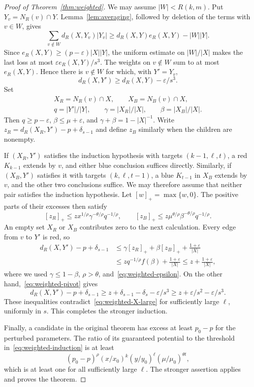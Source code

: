 \documentclass[11pt]{article}
\theoremstyle{definition}
\theoremstyle{remark}
\numberwithin{equation}{section}
\begin{document}
\begin{proof}[Proof of Theorem~\ref{thm:weighted}]
We may assume $|W|<R(k,m)$. Put $Y_v=N_R(v)\cap Y$. Lemma~\ref{lem:averaging}, followed by deletion of the terms with $v\in W$, gives
\[
 \sum_{v\notin W}d_R(X,Y_v)|Y_v|
 \ge d_R(X,Y)e_R(X,Y)-|W||Y|.
\]
Since $e_R(X,Y)\ge(p-\varepsilon)|X||Y|$, the uniform estimate on $|W|/|X|$ makes the last loss at most $\varepsilon e_R(X,Y)/s^3$. The weights on $v\notin W$ sum to at most $e_R(X,Y)$. Hence there is $v\notin W$ for which, with $Y'=Y_v$,
\begin{equation}\label{eq:weighted-pivot}
 d_R(X,Y')\ge d_R(X,Y)-\varepsilon/s^3.
\end{equation}
Set
\begin{gather*}
 X_R=N_R(v)\cap X,\qquad X_B=N_B(v)\cap X,\\
 q=|Y'|/|Y|,\qquad\gamma=|X_R|/|X|,\qquad\beta=|X_B|/|X|.
\end{gather*}
Then $q\ge p-\varepsilon$, $\beta\le\mu+\varepsilon$, and $\gamma+\beta=1-|X|^{-1}$. Write $z_R=d_R(X_R,Y')-p+\delta_{s-1}$ and define $z_B$ similarly when the children are nonempty.

If $(X_R,Y')$ satisfies the induction hypothesis with targets
$(k-1,\ell,t)$, a red $K_{k-1}$ extends by $v$, and either blue
conclusion suffices directly. Similarly, if $(X_B,Y')$ satisfies it
with targets $(k,\ell,t-1)$, a blue $K_{t-1}$ in $X_B$ extends by
$v$, and the other two conclusions suffice. We may therefore assume
that neither pair satisfies the induction hypothesis. Let
$[w]_+=\max\{w,0\}$. The positive parts of their excesses then satisfy
\[
 [z_R]_+\le z x^{1/\rho}\gamma^{-\theta/\rho}q^{-1/\rho},
 \qquad
 [z_B]_+\le z\mu^{\theta/\rho}\beta^{-\theta/\rho}q^{-1/\rho}.
\]
An empty set $X_R$ or $X_B$ contributes zero to the next calculation. Every edge from $v$ to $Y'$ is red, so
\begin{align*}
 d_R(X,Y')-p+\delta_{s-1}
 &\le\gamma[z_R]_++\beta[z_B]_++\frac{1+\varepsilon}{|X|}\\
 &\le zq^{-1/\rho}f(\beta)+\frac{1+\varepsilon}{|X|}
 \le z+\frac{1+\varepsilon}{|X|},
\end{align*}
where we used $\gamma\le1-\beta$, $\rho>\theta$, and~\eqref{eq:weighted-epsilon}. On the other hand,~\eqref{eq:weighted-pivot} gives
\[
 d_R(X,Y')-p+\delta_{s-1}
 \ge z+\delta_{s-1}-\delta_s-\varepsilon/s^3
 \ge z+\varepsilon/s^2-\varepsilon/s^3.
\]
These inequalities contradict~\eqref{eq:weighted-X-large} for sufficiently large $\ell$, uniformly in $s$. This completes the stronger induction.

Finally, a candidate in the original theorem has excess at least $p_0-p$ for the perturbed parameters. The ratio of its guaranteed potential to the threshold in~\eqref{eq:weighted-induction} is at least
\[
 (p_0-p)^\rho(x/x_0)^k(y/y_0)^\ell(\mu/\mu_0)^{\theta t},
\]
which is at least one for all sufficiently large $\ell$. The stronger assertion applies and proves the theorem.
\end{proof}
\end{document}
